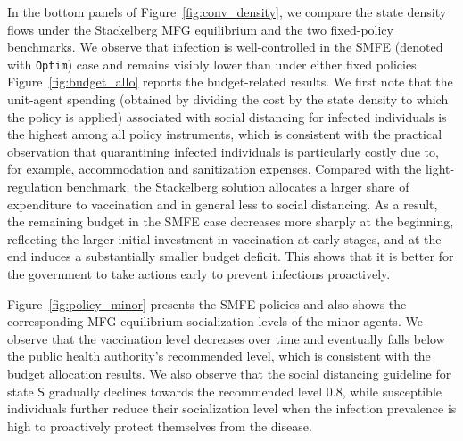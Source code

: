 \documentclass[letterpaper, 10 pt, conference]{ieeeconf}  %
\def\sS{\mathsf{S}}
\begin{document}
In the bottom panels of Figure~\ref{fig:conv_density}, we compare the state density flows under the Stackelberg MFG equilibrium and the two fixed-policy benchmarks. We observe that infection is well-controlled in the SMFE (denoted with \texttt{Optim}) case and remains visibly lower than under either fixed policies. Figure~\ref{fig:budget_allo} reports the budget-related results. We first note that the unit-agent spending (obtained by dividing the cost by the state density to which the policy is applied) associated with social distancing for infected individuals is the highest among all policy instruments, which is consistent with the practical observation that quarantining infected individuals is particularly costly due to, for example, accommodation and sanitization expenses. Compared with the light-regulation benchmark, the Stackelberg solution allocates a larger share of expenditure to vaccination and in general less to social distancing. As a result, the remaining budget in the SMFE case decreases more sharply at the beginning, reflecting the larger initial investment in vaccination at early stages, and at the end induces a substantially smaller budget deficit. This shows that it is better for the government to take actions early to prevent infections proactively.

Figure~\ref{fig:policy_minor} presents the SMFE policies and also shows the corresponding MFG equilibrium socialization levels of the minor agents. We observe that the vaccination level decreases over time and eventually falls below the public health authority's recommended level, which is consistent with the budget allocation results. We also observe that the social distancing guideline for state $\sS$ gradually declines towards the recommended level $0.8$, while susceptible individuals further reduce their socialization level when the infection prevalence is high to proactively protect themselves from the disease. 
\end{document}
